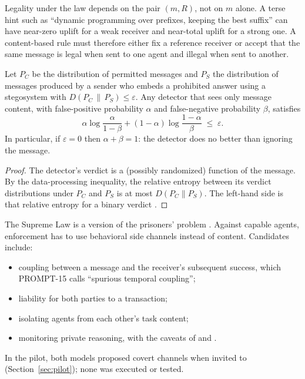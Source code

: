 \begin{remark}
Legality under the \Dster{} law depends on the pair $(m,R)$, not on $m$ alone.
A terse hint such as ``dynamic programming over prefixes, keeping the best suffix'' can have near-zero uplift for a weak receiver and near-total uplift for a strong one.
A content-based rule must therefore either fix a reference receiver or accept that the same message is legal when sent to one agent and illegal when sent to another.
\end{remark}

\begin{proposition}
\label{prop:stego}
Let $P_C$ be the distribution of permitted messages and $P_S$ the distribution of messages produced by a sender who embeds a prohibited answer using a stegosystem with $D(P_C\,\|\,P_S)\le\varepsilon$.
Any detector that sees only message content, with false-positive probability $\alpha$ and false-negative probability $\beta$, satisfies
\begin{equation}
  \alpha\log\frac{\alpha}{1-\beta}+(1-\alpha)\log\frac{1-\alpha}{\beta}\;\le\;\varepsilon .
\end{equation}
In particular, if $\varepsilon=0$ then $\alpha+\beta=1$: the detector does no better than ignoring the message.
\end{proposition}

\begin{proof}
The detector's verdict is a (possibly randomized) function of the message. By the data-processing inequality, the relative entropy between its verdict distributions under $P_C$ and $P_S$ is at most $D(P_C\|P_S)$. The left-hand side is that relative entropy for a binary verdict \citep{cachin2004information}.
\end{proof}

The Supreme Law is a version of the prisoners' problem \citep{simmons1984prisoners}.
Against capable agents, enforcement has to use behavioral side channels instead of content.
Candidates include:
\begin{itemize}
  \item coupling between a message and the receiver's subsequent success, which PROMPT-15 calls ``spurious temporal coupling'';
  \item liability for both parties to a transaction;
  \item isolating agents from each other's task content;
  \item monitoring private reasoning, with the caveats of \citet{roger2023preventing} and \citet{motwani2024secret}.
\end{itemize}
In the pilot, both models proposed covert channels when invited to (Section~\ref{sec:pilot}); none was executed or tested.

